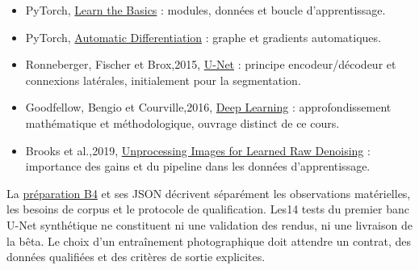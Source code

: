 \documentclass[12pt,a4paper,oneside]{report}
\begin{document}
\begin{itemize}
\item PyTorch, \href{https://docs.pytorch.org/tutorials/beginner/basics/intro.html}{Learn the Basics} : modules, données et boucle d'apprentissage.
\item PyTorch, \href{https://docs.pytorch.org/tutorials/beginner/basics/autogradqs_tutorial.html}{Automatic Differentiation} : graphe et gradients automatiques.
\item Ronneberger, Fischer et Brox,2015, \href{https://lmb.informatik.uni-freiburg.de/people/ronneber/u-net/}{U-Net} : principe encodeur/décodeur et connexions latérales, initialement pour la segmentation.
\item Goodfellow, Bengio et Courville,2016, \href{https://www.deeplearningbook.org/}{Deep Learning} : approfondissement mathématique et méthodologique, ouvrage distinct de ce cours.
\item Brooks et al.,2019, \href{https://github.com/google-research/google-research/tree/master/unprocessing}{Unprocessing Images for Learned Raw Denoising} : importance des gains et du pipeline dans les données d'apprentissage.
\end{itemize}

La \href{../architecture/restauration-neuronale.md}{préparation B4} et ses JSON
décrivent séparément les observations matérielles, les besoins de corpus et
le protocole de qualification. Les14 tests du premier banc U-Net synthétique
ne constituent ni une validation des rendus, ni une livraison de la bêta.
Le choix d'un entraînement photographique doit attendre un contrat, des données
qualifiées et des critères de sortie explicites.
\end{document}
